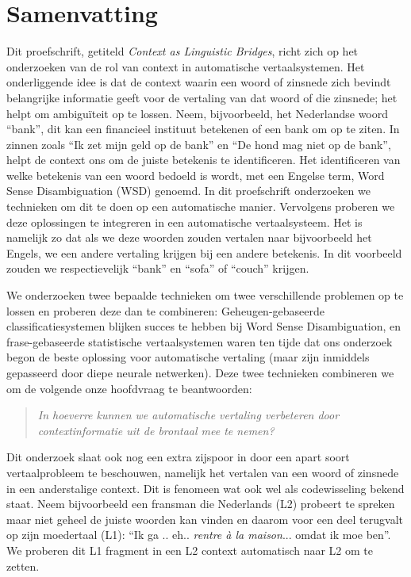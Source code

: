 \chapter*{Samenvatting}

Dit proefschrift, getiteld \emph{Context as Linguistic Bridges}, richt zich op het onderzoeken van de rol van context in
automatische vertaalsystemen. Het onderliggende idee is dat de context waarin een woord of zinsnede zich bevindt
belangrijke informatie geeft voor de vertaling van dat woord of die zinsnede; het helpt om ambiguïteit op te lossen.
Neem, bijvoorbeeld, het Nederlandse woord ``bank'', dit kan een financieel instituut betekenen of een bank om op te
ziten. In zinnen zoals ``Ik zet mijn geld op de bank'' en ``De hond mag niet op de bank'', helpt de context ons om de
juiste betekenis te identificeren. Het identificeren van welke betekenis van een woord bedoeld is wordt, met een Engelse
term, Word Sense Disambiguation (WSD) genoemd. In dit proefschrift onderzoeken we technieken om dit te doen op een
automatische manier. Vervolgens proberen we deze oplossingen te integreren in een automatische vertaalsysteem. Het is
namelijk zo dat als we deze woorden zouden vertalen naar bijvoorbeeld het Engels, we een andere vertaling krijgen bij
een andere betekenis. In dit voorbeeld zouden we respectievelijk ``bank'' en ``sofa'' of ``couch'' krijgen.

We onderzoeken twee bepaalde technieken om twee verschillende problemen op te lossen en proberen deze dan te
combineren: Geheugen-gebaseerde classificatiesystemen blijken succes te hebben bij Word Sense Disambiguation, en
frase-gebaseerde statistische vertaalsystemen waren ten tijde dat ons onderzoek begon de beste oplossing voor
automatische vertaling (maar zijn inmiddels gepasseerd door diepe neurale netwerken). Deze twee technieken combineren we
om de volgende onze hoofdvraag te beantwoorden:

\begin{quote}
\emph{In hoeverre kunnen we automatische vertaling verbeteren door contextinformatie uit de brontaal mee te nemen?}
\end{quote}

Dit onderzoek slaat ook nog een extra zijspoor in door een apart soort vertaalprobleem te beschouwen, namelijk het vertalen
van een woord of zinsnede in een anderstalige context. Dit is fenomeen wat ook wel als codewisseling bekend staat. Neem
bijvoorbeeld een fransman die Nederlands (L2) probeert te spreken maar niet geheel de juiste woorden kan vinden en
daarom voor een deel terugvalt op zijn moedertaal (L1): ``Ik ga .. eh.. \emph{rentre à la maison}... omdat ik moe ben''.
We proberen dit L1 fragment in een L2 context automatisch naar L2 om te zetten.

